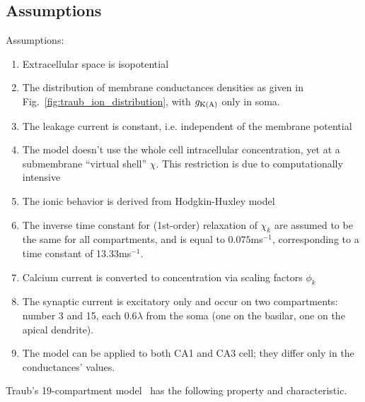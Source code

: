 \subsection{Assumptions}
\label{sec:assumptions-2}

Assumptions:
\begin{enumerate}
\item Extracellular space is isopotential

\item The distribution of membrane conductances densities as given in
  Fig.~\ref{fig:traub_ion_distribution}, with $g_{\ce{K(A)}}$ only in
  soma. 

\item The leakage current is constant, i.e. independent of the
  membrane potential
\item The model doesn't use the whole cell intracellular 
  concentration, yet at a submembrane ``virtual shell'' $\chi$. This
  restriction is due to computationally intensive%

\item The ionic behavior is derived from Hodgkin-Huxley model

\item The inverse time constant for (1st-order) relaxation of $\chi_k$
  are assumed to be the same for all compartments, and is equal to
  $0.075$ms$^{-1}$, corresponding to a time constant of
  13.33ms$^{-1}$.
\item Calcium current is converted to  concentration via
  scaling factors $\phi_k$ 
\item The synaptic current is excitatory only and occur on two
  compartments: number 3 and 15, each $0.6\lambda$ from the soma (one
  on the basilar, one on the apical dendrite). 
\item The model can be applied to both CA1 and CA3 cell; they differ
  only in the conductances' values.
\end{enumerate}

Traub's 19-compartment model~\citep{traub1991ca3} has the following
property and characteristic.

